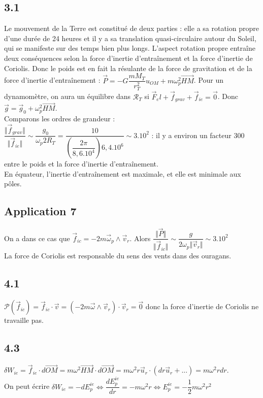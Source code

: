 \documentclass[a4paper,12pt]{book}
\begin{document}
\subsection{3.1}
Le mouvement de la Terre est constitué de deux parties : elle a sa rotation propre d'une durée de 24 heures et il y a sa translation quasi-circulaire autour du Soleil, qui se manifeste sur des temps bien plus longs. L'aspect rotation propre entraîne deux conséquences selon la force d'inertie d'entraînement et la force d'inertie de Coriolis. Donc le poids est en fait la résulante de la force de gravitation et de la force d'inertie d'entraînement : $\vec{P} = -G\dfrac{mM_T}{r_T^2}u_{OM} + m\omega_p^2\vec{HM}$. Pour un dynamomètre, on aura un équilibre dans $\mathcal{R}_T$ si $\vec{F}_el + \vec{f}_{grav} +\vec{f}_{ie}=\vec{0}$. Donc $\vec{g} = \vec{g}_0 + \omega_p^2\vec{HM}$.
\\ Comparons les ordres de grandeur : $\dfrac{\Vert \vec{f}_{grav}\Vert}{\Vert\vec{f}_{ie}\Vert}\sim\dfrac{g_0}{\omega_p2R_T} = \dfrac{10}{\left(\dfrac{2\pi}{8,6.10^4}\right)6,4.10^6}\sim 3.10^2$ : il y a environ un facteur 300 entre le poids et la force d'inertie d'entraînement.
\\ En équateur, l'inertie d'entraînement est maximale, et elle est minimale aux pôles.

\subsection{Application 7}
On a dans ce cas que $\vec{f}_{ic} = -2m\vec{\omega}_p\wedge\vec{v}_r$. Alors $\dfrac{\Vert\vec{P}\Vert}{\Vert\vec{f}_{ic}\Vert}\sim \dfrac{g}{2\omega_p\Vert\vec{v}_r\Vert}\sim 3.10^2$ 
\\ La force de Coriolis est responsable du sens des vents dans des ouragans.

\subsection{4.1}
$\mathcal{P}(\vec{f}_{ic}) = \vec{f}_{ic}\cdot\vec{v} = \left(-2m\vec{\omega}\wedge\vec{v}_r\right)\cdot\vec{v}_r=\vec{0}$ donc la force d'inertie de Coriolis ne travaille pas.

\subsection{4.3}
$\delta W_{ie} = \vec{f}_{ie}\cdot d\vec{OM} = m\omega^2\vec{HM}\cdot d\vec{OM} = m\omega^2r\vec{u}_r\cdot(dr\vec{u}_r +...) = m\omega^2rdr$.
\\ On peut écrire $\delta W_{ie} = -dE_p^{ie} \Leftrightarrow \dfrac{dE_p^{ie}}{dr} = -m\omega^2r \Leftrightarrow E_p^{ie} =-\dfrac{1}{2}m\omega^2r^2$ 
\end{document}

